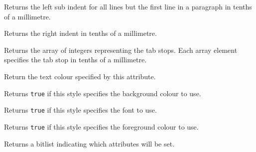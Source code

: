 \label{wxtextattrgetleftsubindent}


Returns the left sub indent for all lines but the first line in a paragraph in
tenths of a millimetre.


\label{wxtextattrgetrightindent}


Returns the right indent in tenths of a millimetre.


\label{wxtextattrgettabs}


Returns the array of integers representing the tab stops. Each
array element specifies the tab stop in tenths of a millimetre.


\label{wxtextattrgettextcolour}


Return the text colour specified by this attribute.


\label{wxtextattrhasbackgroundcolour}


Returns {\tt true} if this style specifies the background colour to use.


\label{wxtextattrhasfont}


Returns {\tt true} if this style specifies the font to use.


\label{wxtextattrhastextcolour}


Returns {\tt true} if this style specifies the foreground colour to use.


\label{wxtextattrgetflags}


Returns a bitlist indicating which attributes will be set.


\label{wxtextattrisdefault}


